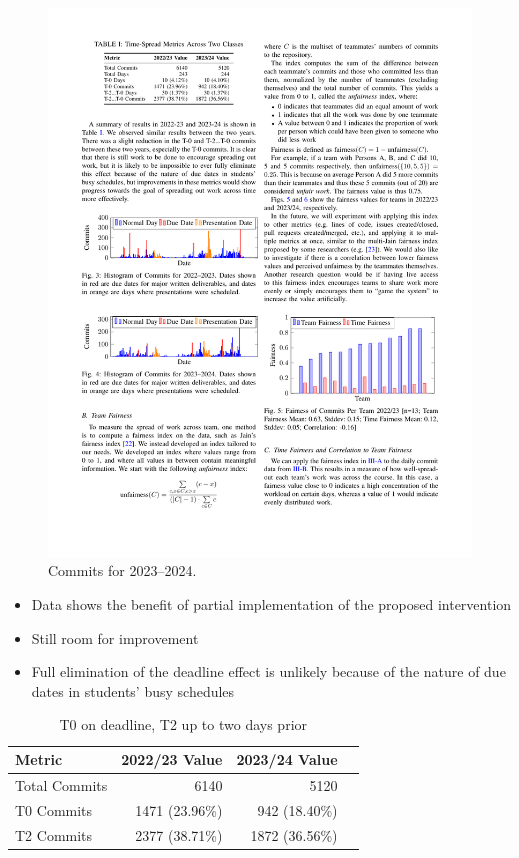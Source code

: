 \documentclass[poster, a0, plainboxedsections]{sciposter}
\begin{document}
\begin{multicols}{2}
\begin{figure}[h!]
\centering
\includegraphics[width=0.9\linewidth]{../figures/HistCommits2023-24.pdf}
\caption{Commits for 2023--2024.}\label{Fig_23_24Timeline}
\end{figure}

\begin{itemize}
\item Data shows the benefit of partial implementation of the proposed
intervention
\item Still room for improvement
\item Full elimination of the deadline effect is unlikely because of the nature
of due dates in students' busy schedules
\end{itemize}

\begin{table}
\caption{T0 on deadline, T2 up to two days prior}
\centering
\begin{tabular}{@{}lrrr@{}}
\toprule
\textbf{Metric} & \textbf{2022/23 Value} & \textbf{2023/24 Value} \\ 
\midrule
Total Commits & 6140 & 5120 \\
T0 Commits & 1471 (23.96\%) & 942 (18.40\%) \\
T2 Commits & 2377 (38.71\%) & 1872 (36.56\%) \\ 
\bottomrule
\end{tabular}
\end{table}


\end{multicols}
\end{document}
